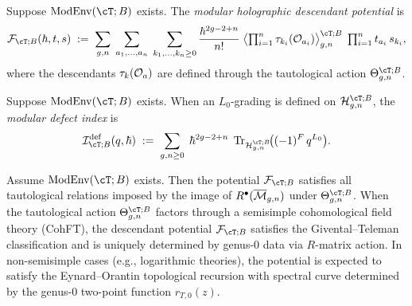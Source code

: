 \begin{definition}
Suppose $\ModEnv(\cT;B)$ exists. The \emph{modular holographic descendant potential} is
\[
\mathcal{F}_{\cT;B}(\hbar,t,s)
\;:=\;
\sum_{g,n}\;\sum_{a_1,\dots,a_n}\;\sum_{k_1,\dots,k_n\ge 0}
\frac{\hbar^{2g-2+n}}{n!}\;
\bigl\langle
 \textstyle\prod_{i=1}^{n}\tau_{k_i}(\cO_{a_i})
\bigr\rangle_{g,n}^{\cT;B}\;
\prod_{i=1}^{n} t_{a_i}\,s_{k_i},
\]
where the descendants
$\tau_{k}(\mathcal O_{a})$ are defined through the tautological action
$\Theta_{g,n}^{\cT;B}$.
\end{definition}

\begin{definition}
Suppose $\ModEnv(\cT;B)$ exists. When an $L_0$-grading is defined on
$\mathcal{H}_{g,n}^{\cT;B}$, the \emph{modular defect index} is
\[
\mathcal{I}_{\cT;B}^{\mathrm{def}}(q,\hbar)
\;:=\;
\sum_{g,n\ge 0}\;
\hbar^{2g-2+n}\;
\Tr_{\mathcal{H}_{g,n}^{\cT;B}}\!\bigl((-1)^F\,q^{L_0}\bigr).
\]
\end{definition}

\begin{conjecture}
Assume $\ModEnv(\cT;B)$ exists. Then the potential $\mathcal{F}_{\cT;B}$ satisfies all tautological
relations imposed by the image of
$R^{\bullet}(\overline{\mathcal M}_{g,n})$ under
$\Theta_{g,n}^{\cT;B}$. When the tautological action $\Theta_{g,n}^{\cT;B}$ factors through a
semisimple cohomological field theory (CohFT), the descendant potential
$\mathcal{F}_{\cT;B}$ satisfies the Givental--Teleman classification and is
uniquely determined by genus-$0$ data via $R$-matrix action. In
non-semisimple cases (e.g., logarithmic theories), the potential is expected
to satisfy the Eynard--Orantin topological recursion with spectral curve
determined by the genus-$0$ two-point function $r_{T,0}(z)$.
\end{conjecture}

